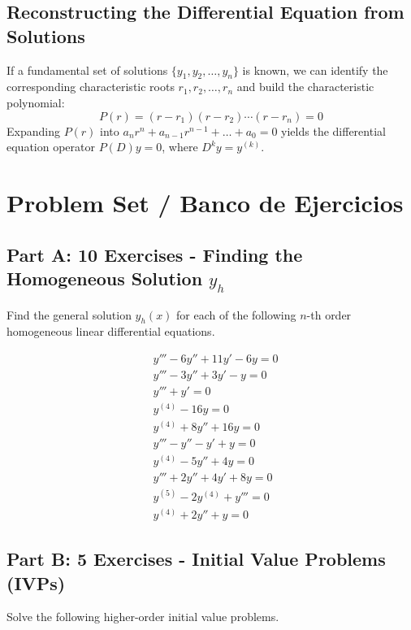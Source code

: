 \documentclass[11pt,letterpaper]{article}
\begin{document}
\subsection{Reconstructing the Differential Equation from Solutions}
If a fundamental set of solutions $\{y_1, y_2, \dots, y_n\}$ is known, we can identify the corresponding characteristic roots $r_1, r_2, \dots, r_n$ and build the characteristic polynomial:
\begin{equation}
    P(r) = (r - r_1)(r - r_2) \cdots (r - r_n) = 0
\end{equation}
Expanding $P(r)$ into $a_n r^n + a_{n-1} r^{n-1} + \dots + a_0 = 0$ yields the differential equation operator $P(D)y = 0$, where $D^k y = y^{(k)}$.

\newpage
\section{Problem Set / Banco de Ejercicios}

\subsection*{Part A: 10 Exercises - Finding the Homogeneous Solution $y_h$}
Find the general solution $y_h(x)$ for each of the following $n$-th order homogeneous linear differential equations.

\begin{align}
    & y''' - 6y'' + 11y' - 6y = 0 \label{eq:nth_1} \\
    & y''' - 3y'' + 3y' - y = 0 \label{eq:nth_2} \\
    & y''' + y' = 0 \label{eq:nth_3} \\
    & y^{(4)} - 16y = 0 \label{eq:nth_4} \\
    & y^{(4)} + 8y'' + 16y = 0 \label{eq:nth_5} \\
    & y''' - y'' - y' + y = 0 \label{eq:nth_6} \\
    & y^{(4)} - 5y'' + 4y = 0 \label{eq:nth_7} \\
    & y''' + 2y'' + 4y' + 8y = 0 \label{eq:nth_8} \\
    & y^{(5)} - 2y^{(4)} + y''' = 0 \label{eq:nth_9} \\
    & y^{(4)} + 2y'' + y = 0 \label{eq:nth_10}
\end{align}

\subsection*{Part B: 5 Exercises - Initial Value Problems (IVPs)}
Solve the following higher-order initial value problems.
\end{document}
